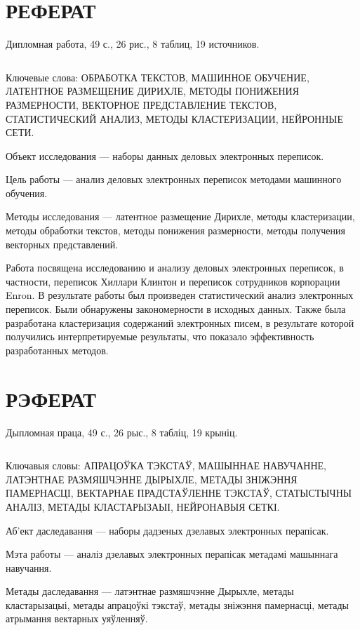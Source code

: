 \chapter*{РЕФЕРАТ}

Дипломная работа, 49 с., 26 рис., 8 таблиц, 19 источников.

$ $

Ключевые слова: ОБРАБОТКА ТЕКСТОВ, МАШИННОЕ ОБУЧЕНИЕ, ЛАТЕНТНОЕ РАЗМЕЩЕНИЕ ДИРИХЛЕ, МЕТОДЫ ПОНИЖЕНИЯ РАЗМЕРНОСТИ, ВЕКТОРНОЕ ПРЕДСТАВЛЕНИЕ ТЕКСТОВ, СТАТИСТИЧЕСКИЙ АНАЛИЗ, МЕТОДЫ КЛАСТЕРИЗАЦИИ, НЕЙРОННЫЕ СЕТИ.

\vspace{1.5 ex}
Объект исследования --- наборы данных деловых электронных переписок. 

Цель работы --- анализ деловых электронных переписок методами машинного обучения.

Методы исследования --- латентное размещение Дирихле, методы кластеризации, методы обработки текстов, методы понижения размерности, методы получения векторных представлений.

Работа посвящена исследованию и анализу деловых электронных переписок, в частности, переписок Хиллари Клинтон и переписок сотрудников корпорации Enron. В результате работы был произведен статистический анализ электронных переписок. Были обнаружены закономерности в исходных данных. Также была разработана кластеризация содержаний электронных писем, в результате которой получились интерпретируемые результаты, что показало эффективность разработанных методов.
 


\chapter*{РЭФЕРАТ}

Дыпломная праца, 49 с., 26 рыс., 8 табліц, 19 крыніц.

$ $

Ключавыя словы: АПРАЦОЎКА ТЭКСТАЎ, МАШЫННАЕ НАВУЧАННЕ, ЛАТЭНТНАЕ РАЗМЯШЧЭННЕ ДЫРЫХЛЕ, МЕТАДЫ ЗНІЖЭННЯ ПАМЕРНАСЦІ, ВЕКТАРНАЕ ПРАДСТАЎЛЕННЕ ТЭКСТАЎ, СТАТЫСТЫЧНЫ АНАЛІЗ, МЕТАДЫ КЛАСТАРЫЗАЫІ, НЕЙРОНАВЫЯ СЕТКІ.

Аб'ект даследавання --- наборы дадзеных дзелавых электронных перапісак.

Мэта работы --- аналіз дзелавых электронных перапісак метадамі машыннага навучання.

Метады даследавання --- латэнтнае размяшчэнне Дырыхле, метады кластарызацыі, метады апрацоўкі тэкстаў, метады зніжэння памернасці, метады атрымання вектарных уяўленняў.


